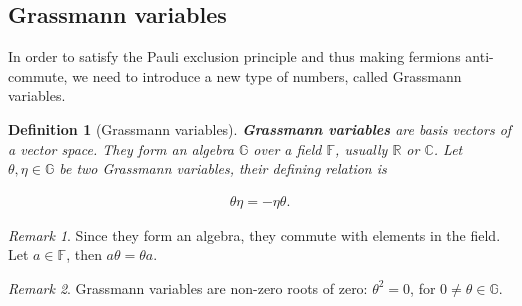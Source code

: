 \documentclass{article}
\theoremstyle{plain} %
\newtheorem{definition}{Definition}[section]
\theoremstyle{convention} %
\theoremstyle{remark} %
\newtheorem*{remark}{Remark} %
\def\df#1{\textbf{\textit{#1}}}
\numberwithin{equation}{section}
\begin{document}
\begin{appendix}

\subsection{Grassmann variables}

\label{sec:grassmann}

In order to satisfy the Pauli exclusion principle and thus making fermions anti-commute, we need to introduce a new type of numbers, called Grassmann variables.

\begin{definition}[Grassmann variables]

\df{Grassmann variables} are basis vectors of a vector space. They form an algebra $\mathbb{G}$ over a field $\mathbb{F}$, usually $\mathbb{R}$ or $\mathbb{C}$. Let $\theta, \eta \in \mathbb{G}$ be two Grassmann variables, their defining relation is

\begin{align*}
    \theta \eta = - \eta \theta.
\end{align*}

\end{definition}

\begin{remark}
  Since they form an algebra, they commute with elements in the field. Let $a \in \mathbb{F}$, then $a \theta = \theta a$.
\end{remark}
\begin{remark}
  Grassmann variables are non-zero roots of zero: $\theta^2 = 0$, for $0 \ne \theta \in \mathbb{G}$.
\end{remark}


\end{appendix}
\end{document}
